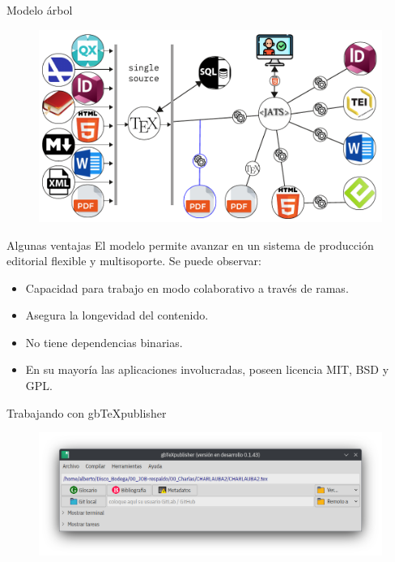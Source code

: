 \documentclass[14pt,aspectratio=169]{beamer}
\begin{document}
\begin{frame}{Modelo árbol}
	\begin{figure}
		\centering
		\includegraphics[width=.8\textwidth]{arbol2.pdf}
	\end{figure}
\end{frame}

\begin{frame}{Algunas ventajas}
El modelo permite avanzar en un sistema de producción editorial flexible y multisoporte. Se puede observar:

\begin{itemize}
	\item<2-> Capacidad para trabajo en modo colaborativo a través de ramas.
	\item<3-> Asegura la longevidad del contenido.
	\item<4-> No tiene dependencias binarias.
	\item<5-> En su mayoría las aplicaciones involucradas, poseen licencia MIT, BSD y GPL.
\end{itemize}
\end{frame}

\begin{frame}{Trabajando con gbTeXpublisher}
	\begin{figure}
		\centering
		\includegraphics[width=.8\textwidth]{captura.png}
	\end{figure}
\end{frame}

\end{document}
